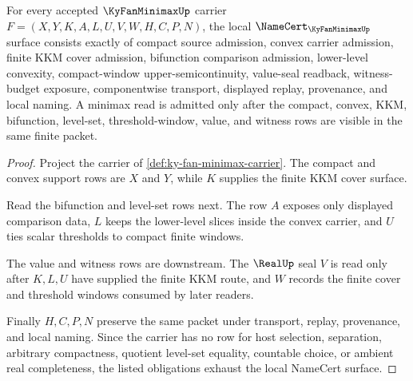 \begin{theorem}
\label{thm:ky-fan-minimax-namecert-obligations}
For every accepted $\KyFanMinimaxUp$ carrier $F=(X,Y,K,A,L,U,V,W,H,C,P,N)$, the local $\NameCert_{\KyFanMinimaxUp}$ surface consists exactly of compact source admission, convex carrier admission, finite KKM cover admission, bifunction comparison admission, lower-level convexity, compact-window upper-semicontinuity, value-seal readback, witness-budget exposure, componentwise transport, displayed replay, provenance, and local naming. A minimax read is admitted only after the compact, convex, KKM, bifunction, level-set, threshold-window, value, and witness rows are visible in the same finite packet.
\end{theorem}
\begin{proof}
Project the carrier of \autoref{def:ky-fan-minimax-carrier}. The compact and convex support rows are $X$ and $Y$, while $K$ supplies the finite KKM cover surface.

Read the bifunction and level-set rows next. The row $A$ exposes only displayed comparison data, $L$ keeps the lower-level slices inside the convex carrier, and $U$ ties scalar thresholds to compact finite windows.

The value and witness rows are downstream. The $\RealUp$ seal $V$ is read only after $K,L,U$ have supplied the finite KKM route, and $W$ records the finite cover and threshold windows consumed by later readers.

Finally $H,C,P,N$ preserve the same packet under transport, replay, provenance, and local naming. Since the carrier has no row for host selection, separation, arbitrary compactness, quotient level-set equality, countable choice, or ambient real completeness, the listed obligations exhaust the local NameCert surface.
\end{proof}

